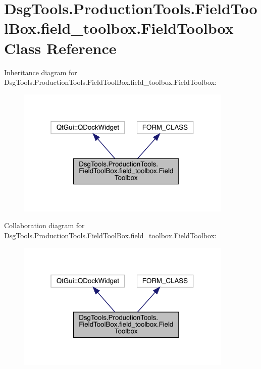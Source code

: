 \hypertarget{class_dsg_tools_1_1_production_tools_1_1_field_tool_box_1_1field__toolbox_1_1_field_toolbox}{}\section{Dsg\+Tools.\+Production\+Tools.\+Field\+Tool\+Box.\+field\+\_\+toolbox.\+Field\+Toolbox Class Reference}
\label{class_dsg_tools_1_1_production_tools_1_1_field_tool_box_1_1field__toolbox_1_1_field_toolbox}


Inheritance diagram for Dsg\+Tools.\+Production\+Tools.\+Field\+Tool\+Box.\+field\+\_\+toolbox.\+Field\+Toolbox\+:
\nopagebreak
\begin{figure}[H]
\begin{center}
\leavevmode
\includegraphics[width=292pt]{class_dsg_tools_1_1_production_tools_1_1_field_tool_box_1_1field__toolbox_1_1_field_toolbox__inherit__graph}
\end{center}
\end{figure}


Collaboration diagram for Dsg\+Tools.\+Production\+Tools.\+Field\+Tool\+Box.\+field\+\_\+toolbox.\+Field\+Toolbox\+:
\nopagebreak
\begin{figure}[H]
\begin{center}
\leavevmode
\includegraphics[width=292pt]{class_dsg_tools_1_1_production_tools_1_1_field_tool_box_1_1field__toolbox_1_1_field_toolbox__coll__graph}
\end{center}
\end{figure}

